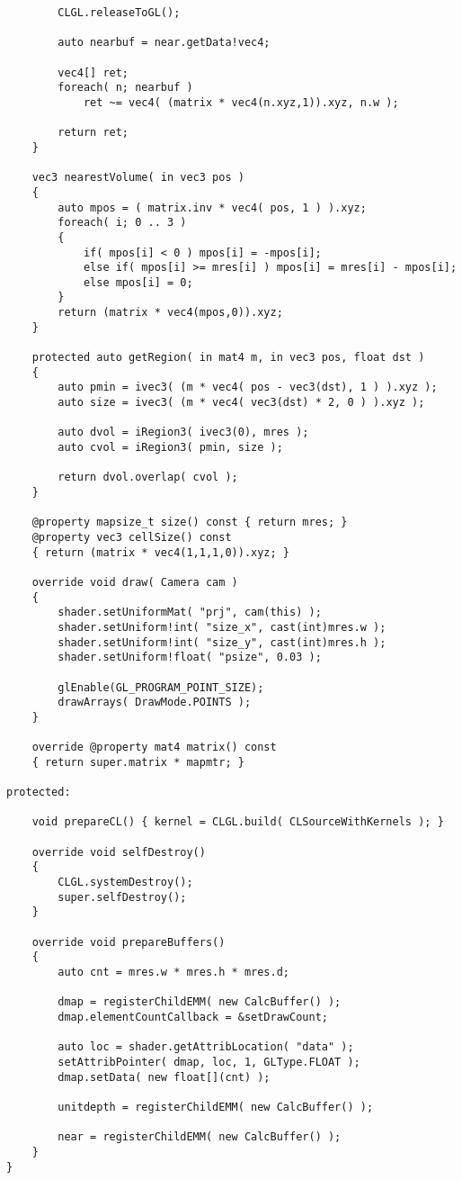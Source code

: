 \begin{verbatim}
        CLGL.releaseToGL();

        auto nearbuf = near.getData!vec4;

        vec4[] ret;
        foreach( n; nearbuf )
            ret ~= vec4( (matrix * vec4(n.xyz,1)).xyz, n.w );

        return ret;
    }

    vec3 nearestVolume( in vec3 pos )
    {
        auto mpos = ( matrix.inv * vec4( pos, 1 ) ).xyz;
        foreach( i; 0 .. 3 )
        {
            if( mpos[i] < 0 ) mpos[i] = -mpos[i];
            else if( mpos[i] >= mres[i] ) mpos[i] = mres[i] - mpos[i];
            else mpos[i] = 0;
        }
        return (matrix * vec4(mpos,0)).xyz;
    }

    protected auto getRegion( in mat4 m, in vec3 pos, float dst )
    {
        auto pmin = ivec3( (m * vec4( pos - vec3(dst), 1 ) ).xyz );
        auto size = ivec3( (m * vec4( vec3(dst) * 2, 0 ) ).xyz );

        auto dvol = iRegion3( ivec3(0), mres );
        auto cvol = iRegion3( pmin, size );

        return dvol.overlap( cvol );
    }

    @property mapsize_t size() const { return mres; }
    @property vec3 cellSize() const 
    { return (matrix * vec4(1,1,1,0)).xyz; }

    override void draw( Camera cam )
    {
        shader.setUniformMat( "prj", cam(this) );
        shader.setUniform!int( "size_x", cast(int)mres.w );
        shader.setUniform!int( "size_y", cast(int)mres.h );
        shader.setUniform!float( "psize", 0.03 );

        glEnable(GL_PROGRAM_POINT_SIZE);
        drawArrays( DrawMode.POINTS );
    }

    override @property mat4 matrix() const
    { return super.matrix * mapmtr; }

protected:

    void prepareCL() { kernel = CLGL.build( CLSourceWithKernels ); }

    override void selfDestroy()
    {
        CLGL.systemDestroy();
        super.selfDestroy();
    }

    override void prepareBuffers()
    {
        auto cnt = mres.w * mres.h * mres.d;

        dmap = registerChildEMM( new CalcBuffer() );
        dmap.elementCountCallback = &setDrawCount;

        auto loc = shader.getAttribLocation( "data" );
        setAttribPointer( dmap, loc, 1, GLType.FLOAT );
        dmap.setData( new float[](cnt) );

        unitdepth = registerChildEMM( new CalcBuffer() );

        near = registerChildEMM( new CalcBuffer() );
    }
}
\end{verbatim}
